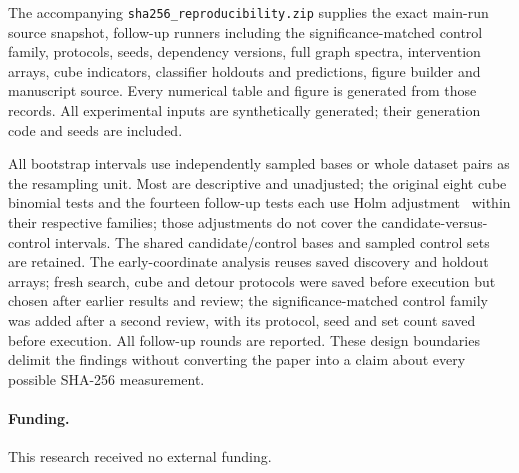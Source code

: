 \documentclass[11pt]{article}
\begin{document}
The accompanying \texttt{sha256\_reproducibility.zip} supplies the exact main-run source snapshot, follow-up runners including the significance-matched control family, protocols, seeds, dependency versions, full graph spectra, intervention arrays, cube indicators, classifier holdouts and predictions, figure builder and manuscript source. Every numerical table and figure is generated from those records. All experimental inputs are synthetically generated; their generation code and seeds are included.

All bootstrap intervals use independently sampled bases or whole dataset pairs as the resampling unit. Most are descriptive and unadjusted; the original eight cube binomial tests and the fourteen follow-up tests each use Holm adjustment~\cite{holm} within their respective families; those adjustments do not cover the candidate-versus-control intervals. The shared candidate/control bases and sampled control sets are retained. The early-coordinate analysis reuses saved discovery and holdout arrays; fresh search, cube and detour protocols were saved before execution but chosen after earlier results and review; the significance-matched control family was added after a second review, with its protocol, seed and set count saved before execution. All follow-up rounds are reported. These design boundaries delimit the findings without converting the paper into a claim about every possible SHA-256 measurement.

\paragraph{Funding.} This research received no external funding.
\end{document}
